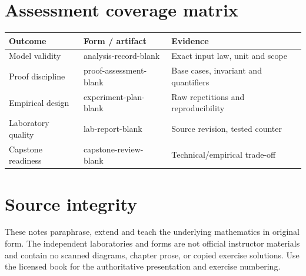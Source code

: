 \documentclass[11pt]{article}
\begin{document}
\section{Assessment coverage matrix}
\begin{longtable}{lll}\toprule Outcome & Form / artifact & Evidence \\ \midrule
Model validity & analysis-record-blank & Exact input law, unit and scope \\
Proof discipline & proof-assessment-blank & Base cases, invariant and quantifiers \\
Empirical design & experiment-plan-blank & Raw repetitions and reproducibility \\
Laboratory quality & lab-report-blank & Source revision, tested counter \\
Capstone readiness & capstone-review-blank & Technical/empirical trade-off \\\bottomrule\end{longtable}
\section{Source integrity}
These notes paraphrase, extend and teach the underlying mathematics in original form. The independent laboratories and forms are not official instructor materials and contain no scanned diagrams, chapter prose, or copied exercise solutions. Use the licensed book for the authoritative presentation and exercise numbering.
\end{document}
